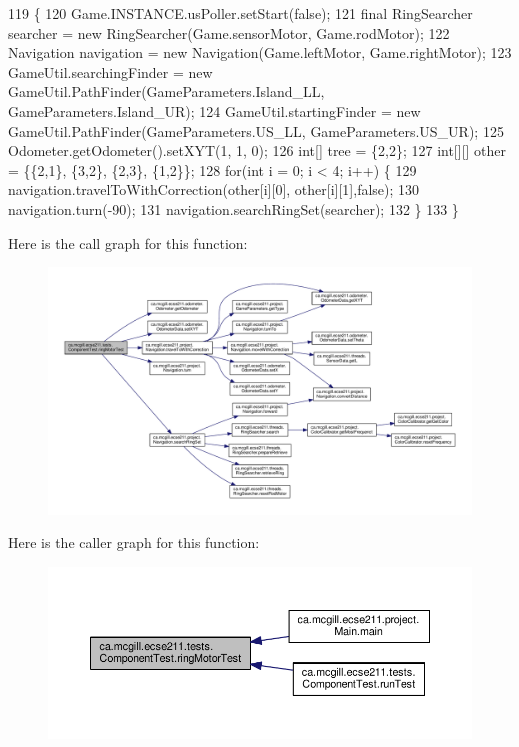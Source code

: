 \begin{DoxyCode}
119                                                                \{
120     Game.INSTANCE.usPoller.setStart(\textcolor{keyword}{false});
121     \textcolor{keyword}{final} RingSearcher searcher = \textcolor{keyword}{new} RingSearcher(Game.sensorMotor, Game.rodMotor);
122     Navigation navigation = \textcolor{keyword}{new} Navigation(Game.leftMotor, Game.rightMotor);
123     GameUtil.searchingFinder = \textcolor{keyword}{new} GameUtil.PathFinder(GameParameters.Island\_LL, GameParameters.Island\_UR);
124     GameUtil.startingFinder = \textcolor{keyword}{new} GameUtil.PathFinder(GameParameters.US\_LL, GameParameters.US\_UR);
125     Odometer.getOdometer().setXYT(1, 1, 0);
126     \textcolor{keywordtype}{int}[] tree = \{2,2\};
127     \textcolor{keywordtype}{int}[][] other = \{\{2,1\}, \{3,2\}, \{2,3\}, \{1,2\}\};
128     \textcolor{keywordflow}{for}(\textcolor{keywordtype}{int} i = 0; i < 4; i++) \{
129       navigation.travelToWithCorrection(other[i][0], other[i][1],\textcolor{keyword}{false});
130       navigation.turn(-90);
131       navigation.searchRingSet(searcher);
132     \}
133   \}
\end{DoxyCode}
Here is the call graph for this function\+:
\nopagebreak
\begin{figure}[H]
\begin{center}
\leavevmode
\includegraphics[width=350pt]{enumca_1_1mcgill_1_1ecse211_1_1tests_1_1_component_test_a1ecca45b47067d825683cf46dcf22b62_cgraph}
\end{center}
\end{figure}
Here is the caller graph for this function\+:
\nopagebreak
\begin{figure}[H]
\begin{center}
\leavevmode
\includegraphics[width=350pt]{enumca_1_1mcgill_1_1ecse211_1_1tests_1_1_component_test_a1ecca45b47067d825683cf46dcf22b62_icgraph}
\end{center}
\end{figure}
